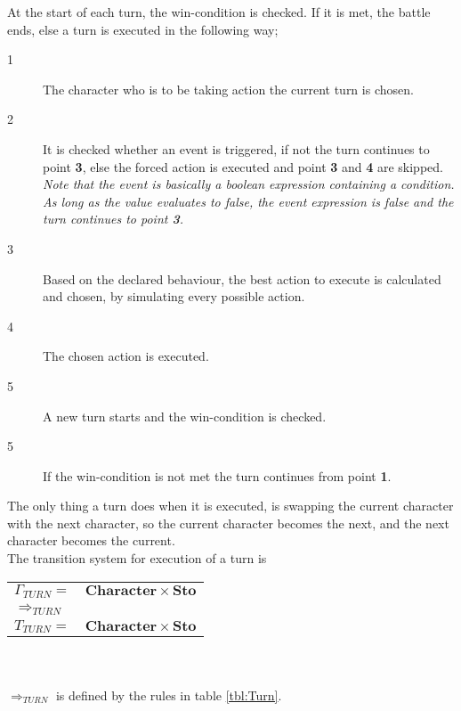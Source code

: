 At the start of each turn, the win-condition is checked. If it is met, the battle ends, else a turn is executed in the following way;

\begin{description}
\item[1] The character who is to be taking action the current turn is chosen.
\item[2] It is checked whether an event is triggered, if not the turn continues to point \textbf{3}, else the forced action is executed and point \textbf{3} and \textbf{4} are skipped.\\
\emph{\small{Note that the event is basically a boolean expression containing a condition. As long as the value evaluates to false, the event expression is false and the turn continues to point \textbf{3}.}}
\item[3] Based on the declared behaviour, the best action to execute is calculated and chosen, by simulating every possible action.
\item[4] The chosen action is executed.
\item[5] A new turn starts and the win-condition is checked.
\item[5] If the win-condition is not met the turn continues from point \textbf{1}.
\end{description}

The only thing a turn does when it is executed, is swapping the current character with the next character, so the current character becomes the next, and the next character becomes the current.\\

The transition system for execution of a turn is

\begin{tabular}{l l}
$\Gamma_{TURN} = $ & $\mathbf{Character \times Sto}$ \\
$\Rightarrow_{TURN}$ & \\
$T_{TURN} = $ & $\mathbf{Character \times Sto}$ \\
\end{tabular}
\\\\
$\Rightarrow_{TURN}$ is defined by the rules in table \ref{tbl:Turn}.\\\\

